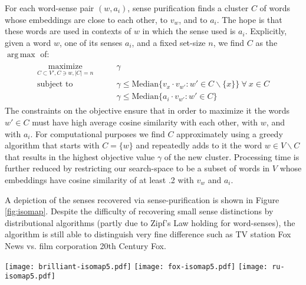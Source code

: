 \documentclass{book}
\DeclareMathOperator*{\argmax}{arg\,max}
\DeclareMathOperator*{\maximize}{\textrm{maximize}}
\begin{document}
For each word-sense pair $(w,a_i)$, sense purification finds a cluster $C$ of words whose embeddings are close to each other, to $v_w$, and to $a_i$.
The hope is that these words are used in contexts of $w$ in which the sense used is $a_i$.
Explicitly, given a word $w$, one of its senses $a_i$, and a fixed set-size $n$, we find $C$ as the $\argmax$ of:
\begin{align}
\label{eqn:objective}
\begin{split}
\maximize\limits_{C\subset V',C\ni w,|C|=n}&\qquad\gamma\\
\textrm{subject to}&\qquad\gamma\le\textrm{Median}\{v_x\cdot v_{w'}:w'\in C\backslash\{x\}\}~\forall~x\in C\\
&\qquad\gamma\le\textrm{Median}\{a_i\cdot v_{w'}:w'\in C\}
\end{split}
\end{align}
The constraints on the objective ensure that in order to maximize it the words $w'\in C$ must have high average cosine similarity with each other, with $w$, and with $a_i$.
For computational purposes we find $C$ approximately using a greedy algorithm that starts with $C=\{w\}$ and repeatedly adds to it the word $w\in V\backslash C$ that results in the highest objective value $\gamma$ of the new cluster.
Processing time is further reduced by restricting our search-space to be a subset of words in $V$ whose embeddings have cosine similarity of at least .2 with $v_w$ and $a_i$.

A depiction of the senses recovered via sense-purification is shown in Figure \ref{fig:isomap}.
Despite the difficulty of recovering small sense distinctions by distributional algorithms (partly due to Zipf's Law holding for word-senses), the algorithm is still able to distinguish very fine difference such as TV station Fox News vs. film corporation 20th Century Fox.

\begin{figure*}[ht!]
\centering
\texttt{[image: brilliant-isomap5.pdf]}
\hspace{5mm}
\texttt{[image: fox-isomap5.pdf]}
\texttt{[image: ru-isomap5.pdf]}
\caption{
Isometric mapping of sense-cluster vectors for $w=$ {\em brilliant}, {\em fox}, and {\em{}лук} (bow, onion). $w$ is marked by a star and each sense $a_i$ of $w$, shown by a large marker, has an associated cluster of words with the same marker shape. Contours are densities of vectors close to $w$ and at least one sense $a_i$. Note how correct senses are recovered across POS and languages and for both proper and common noun senses.}
\label{fig:isomap}
\end{figure*}
\end{document}
